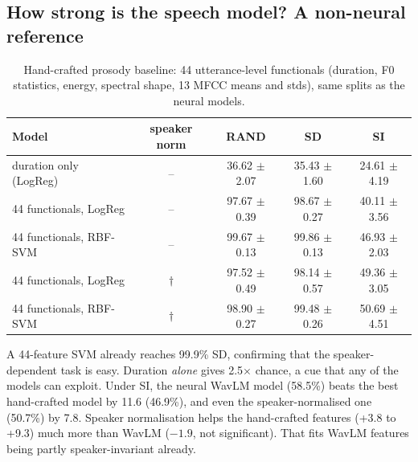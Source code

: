 \subsection{How strong is the speech model? A non-neural reference}
\begin{table}[H]\centering\small
\caption[Hand-crafted prosody baseline]{Hand-crafted prosody baseline: 44 utterance-level functionals (duration, F0 statistics, energy, spectral shape, 13 MFCC means and stds), same splits as the neural models.}\label{tab:prosody}
\begin{tabular}{@{}lcccc@{}}\toprule
Model & speaker norm & RAND & SD & SI\\\midrule
duration only (LogReg) & -- & 36.62 $\pm$ 2.07 & 35.43 $\pm$ 1.60 & 24.61 $\pm$ 4.19\\
44 functionals, LogReg & -- & 97.67 $\pm$ 0.39 & 98.67 $\pm$ 0.27 & 40.11 $\pm$ 3.56\\
44 functionals, RBF-SVM & -- & 99.67 $\pm$ 0.13 & 99.86 $\pm$ 0.13 & 46.93 $\pm$ 2.03\\
44 functionals, LogReg & $\dagger$ & 97.52 $\pm$ 0.49 & 98.14 $\pm$ 0.57 & 49.36 $\pm$ 3.05\\
44 functionals, RBF-SVM & $\dagger$ & 98.90 $\pm$ 0.27 & 99.48 $\pm$ 0.26 & 50.69 $\pm$ 4.51\\\bottomrule
\end{tabular}\end{table}
A 44-feature SVM already reaches 99.9\% SD, confirming that the speaker-dependent task is easy.
Duration \emph{alone} gives 2.5$\times$ chance, a cue that any of the models can exploit.
Under SI, the neural WavLM model (58.5\%) beats the best hand-crafted model by 11.6\pp{} (46.9\%), and even the speaker-normalised one (50.7\%) by 7.8\pp.
Speaker normalisation helps the hand-crafted features (+3.8 to +9.3\pp) much more than WavLM ($-1.9$\pp, not significant).
That fits WavLM features being partly speaker-invariant already.

